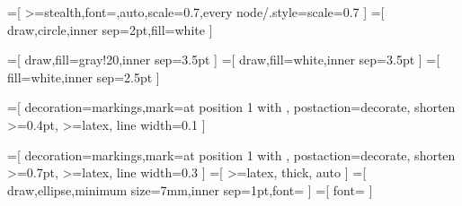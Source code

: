 \setcounter{secnumdepth}{1}

\usepackage{graphicx} %
  \graphicspath{{graphics/}} %
\usepackage{amsmath,amssymb,amsthm}  %
\usepackage{booktabs} %
\usepackage{units}    %
\usepackage{multicol} %
\usepackage{lipsum}   %
\usepackage{fancyvrb} %
\usepackage{listings}
\usepackage{tikz}
\usepackage{mathpartir}
\usepackage{subcaption}
\usepackage{pgfplots}
\usepackage{mdframed}
\usepackage{epigraph}
\usepackage{enumitem}
\usepackage{stmaryrd}

\usetikzlibrary{shapes.geometric}


\usepackage[ruled,linesnumbered]{algorithm2e}
\newcommand{\indep}{\perp \!\!\! \perp}


\usetikzlibrary{patterns,calc,backgrounds}


=[
  >=stealth,font=\small,auto,scale=0.7,every node/.style={scale=0.7}
]
=[
  draw,circle,inner sep=2pt,fill=white
]

=[
  draw,fill=gray!20,inner sep=3.5pt
]
=[
  draw,fill=white,inner sep=3.5pt
]
=[
  fill=white,inner sep=2.5pt
]

=[
    decoration={markings,mark=at position 1 with {\arrow[scale=0.6]{>}}},
    postaction={decorate},
    shorten >=0.4pt,
    >=latex,
    line width=0.1
]

=[
    decoration={markings,mark=at position 1 with {\arrow[scale=1.5]{>}}},
    postaction={decorate},
    shorten >=0.7pt,
    >=latex,
    line width=0.3
]
=[
  >=latex, thick, auto
]
=[
  draw,ellipse,minimum size=7mm,inner sep=1pt,font=\small
]
=[
  font=\footnotesize
]

